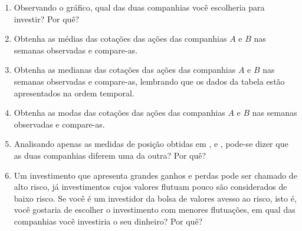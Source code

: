 \documentclass[10 pt,usenames,dvipsnames, oneside]{article}
\begin{document}
\begin{enumerate}
\item Observando o gráfico, qual das duas companhias você escolheria para investir? Por quê?

\item {} 
Obtenha as médias das cotações das ações das companhias $A$ e $B$ nas semanas observadas e compare-as.

\item {} 
Obtenha as medianas das cotações das ações das companhias $A$ e $B$ nas semanas observadas e compare-as, lembrando que os dados da tabela estão apresentados na ordem temporal.

\item {} 
Obtenha as modas das cotações das ações das companhias $A$ e $B$ nas semanas observadas e compare-as.

\item {} 
Analisando apenas as medidas de posição obtidas em ,  e , pode-se dizer que as duas companhias diferem uma da outra? Por quê?

\item {} 
Um investimento que apresenta grandes ganhos e perdas pode ser chamado de alto risco, já investimentos cujos valores flutuam pouco são considerados de baixo risco. Se você é um investidor da bolsa de valores avesso ao risco, isto é, você gostaria de escolher o investimento com menores flutuações, em qual das companhias você investiria o seu dinheiro? Por quê?

\end{enumerate}
\end{document}

